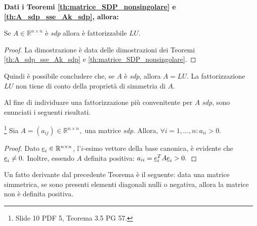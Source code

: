 \textbf{Dati i Teoremi \ref{th:matrice_SDP_nonsingolare} e \ref{th:A_sdp_sse_Ak_sdp}, allora:}
\begin{corollary}
	Se $A\in\mathbb{R}^{n\times n}$ è \textit{sdp} allora è fattorizzabile $LU$. 
\end{corollary}
\begin{proof}
	La dimostrazione è data delle dimostrazioni dei Teoremi \ref{th:A_sdp_sse_Ak_sdp} e \ref{th:matrice_SDP_nonsingolare}.
\end{proof}

Quindi è possibile concludere che, se $A$ è \textit{sdp}, allora $A=LU$. La fattorizzazione $LU$ non tiene di conto della proprietà di simmetria di $A$.

Al fine di individuare una fattorizzazione più convenitente per $A$ \textit{sdp}, sono enunciati i seguenti risultati.

\begin{theorem}\label{th:elDiagPosMatrSDP}\footnote{Slide 10 PDF 5, Teorema 3.5 PG 57.}
    Sia $A=(a_{ij})\in\mathbb R^{n\times n},$ una matrice \textit{sdp}. Allora, $\forall i=1,\hdots,n: a_{ii}>0.$
\end{theorem}
\begin{proof}
    Dato $\uline e_i\in\mathbb R^{n\times n}$, l'$i$-esimo vettore della base canonica, è evidente che $\uline e_i\neq 0.$ Inoltre, essendo $A$ definita positiva: $a_{ii}=\uline e_i^T A \uline e_i>0.$
\end{proof}

Un fatto derivante dal precedente Teorema è il seguente: data una matrice simmetrica, se sono presenti elementi diagonali nulli o negativa, allora la matrice non è definita positiva. 


